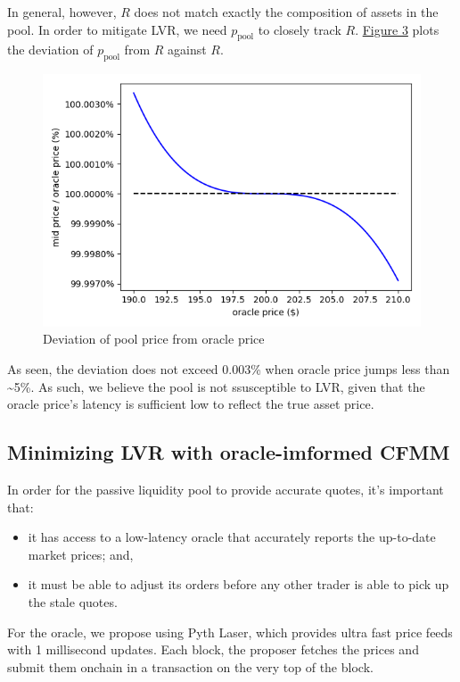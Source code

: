 \documentclass{article}
\begin{document}
In general, however, $R$ does not match exactly the composition of assets in the pool. In order to mitigate LVR, we need $p_{\mathrm{pool}}$ to closely track $R$. \hyperref[fig:3]{Figure 3} plots the deviation of $p_{\mathrm{pool}}$ from $R$ against $R$.

\begin{figure}
  \centering
  \includegraphics[width=4.5in]{3-solidly-pool-price-vs-oracle.png}
  \caption{Deviation of pool price from oracle price}
  \label{fig:3}
\end{figure}

As seen, the deviation does not exceed 0.003\% when oracle price jumps less than \textasciitilde 5\%. As such, we believe the pool is not ssusceptible to LVR, given that the oracle price's latency is sufficient low to reflect the true asset price.

\subsection{Minimizing LVR with oracle-imformed CFMM}

In order for the passive liquidity pool to provide accurate quotes, it's important that:

\begin{itemize}
  \item it has access to a low-latency oracle that accurately reports the up-to-date market prices; and,
  \item it must be able to adjust its orders before any other trader is able to pick up the stale quotes.
\end{itemize}

For the oracle, we propose using Pyth Laser,\supercite{pythlaser} which provides ultra fast price feeds with 1 millisecond updates. Each block, the proposer fetches the prices and submit them onchain in a transaction on the very top of the block.
\end{document}
